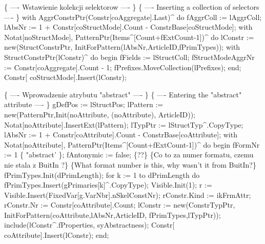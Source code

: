    \{ ---- Wstawienie kolekcji selektorow ---- \}
   \{ ---- Inserting a collection of selectors ---- \}
   with AggrConstrPtr(Constr[coAggregate].Last)^ do
      fAggrColl :=  lAggrColl;
   lAbsNr :=  1 + Constr[coStructMode].Count - ConstrBase[coStructMode]; 
   with Notat[noStructMode], PatternPtr(Items^[Count+fExtCount-1])^ do
   lConstr := new(StructConstrPtr,
                  InitForPattern(lAbsNr,ArticleID,fPrimTypes));
   with StructConstrPtr(lConstr)^ do
   begin
      fFields := lStructColl;
      fStructModeAggrNr := Constr[coAggregate].Count - 1;
      fPrefixes.MoveCollection(lPrefixes);
   end;
   Constr[ coStructMode].Insert(lConstr);
   
   \{ ---- Wprowadzenie atrybutu "abstract" ---- \}
   \{ ---- Entering the "abstract" attribute ---- \}
   gDefPos := lStructPos;
   lPattern := new(PatternPtr,Init(noAttribute, (noAttribute),
                                   ArticleID));
   Notat[noAttribute].InsertExt(lPattern);
   lTypPtr := lStructTyp^.CopyType;
   lAbsNr :=  1 + Constr[coAttribute].Count - ConstrBase[coAttribute]; 
   with Notat[noAttribute], PatternPtr(Items^[Count+fExtCount-1])^ do
   begin
      fFormNr := 1 \{ "abstract' \};
      fAntonymic := false;
      \{??\} \{Co to za numer formatu, czemu nie stala z BuitIn ?\}
      \{What format number is this, why wasn't it from BuitIn?\}
      fPrimTypes.Init(dPrimLength);
      for k := 1 to dPrimLength do
         fPrimTypes.Insert(gPrimaries[k]^.CopyType);
      Visible.Init(1);
      r := Visible.Insert(FixedVar[g.VarNbr].nSkelConstNr);
      rConstr.Kind := ikFrmAttr; rConstr.Nr := Constr[coAttribute].Count;
      lConstr :=  new(ConstrTypPtr, InitForPattern(coAttribute,lAbsNr,ArticleID,
                                                   fPrimTypes,lTypPtr));
      include(lConstr^.fProperties, syAbstractness);
      Constr[ coAttribute].Insert(lConstr);
   end;
   
